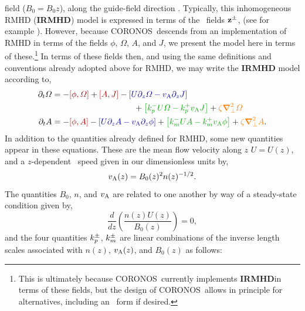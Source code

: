 \documentclass[12pt]{memoir}
\newcommand{\irmhd}{\textbf{IRMHD}}
\newcommand{\coronos}{\textsf{CORONOS}}
\begin{document}
field ($B_0= B_0{z}$), along the guide-field direction 
\citep{HeinemannOlbert80, Vellietal89}.
Typically, this inhomogeneous RMHD (\irmhd) model is expressed in
terms of the \elsasser\ fields $\mathbf{z}^\pm$, 
(see for example \citet{PerezChandran2013}). However, because \coronos\
descends from an implementation of RMHD in terms of the fields
$\phi$, $\Omega$, $A$, and $J$, we present the model here in terms
of these.\footnote{This is ultimately because \coronos\ currently 
implements \irmhd in terms of these fields, but the design of \coronos\ allows 
in principle for alternatives, including an \elsasser\ form if desired.}
In terms of these fields then, and using the same definitions
and conventions already adopted above for RMHD, we may write the \irmhd
model according to,
%
\begin{subequations}
%
  \begin{align}
    \pardt\Omega &=
    - {\color{red!65!black}[\phi,\Omega]} + {\color{red!65!black}[A,J]}
    - {\color{blue!65!black}\left[U\pardz\Omega - \magvalfven\pardz J\right]} \nonumber \\ 
    & \qquad\qquad\qquad\qquad\qquad + {\color{green!65!black}\left[\kpm U\Omega - \kpp\magvalfven J\right]} 
    + {\color{orange}\zeta\delperp^2\Omega}
    \label{eq:ihomega}  \\
%
    \pardt A     &=
    - {\color{red!65!black}[\phi,A]}
    - {\color{blue!65!black}\left[U\pardz A  - \magvalfven\pardz\phi\right]}
    + {\color{green!65!black}\left[\kmm U A  - \kmp\magvalfven\phi\right]}
    + {\color{orange}\zeta\delperp^2A}.
    \label{eq:iha}
  \end{align}
\end{subequations}
%
In addition to the quantities already defined for RMHD, some new quantities
appear in these equations. These are the mean flow velocity along $z$ $U=U(z)$,
and a $z$-dependent \Alfven\ speed given in our dimensionless units by,
%
\begin{equation}
  v_{\mathrm{A}}(z)=B_0(z)^2n(z)^{-1/2}.
\end{equation}
%
The quantities $B_0$, $n$, and $v_{\mathrm{A}}$ are related to one
another by way of a steady-state condition given by, \citep{Whang80}
%
\begin{equation}
  \frac{d}{dz}\left(\frac{n(z)U(z)}{B_0(z)}\right) = 0 \label{eq:consflux},
\end{equation}
%
and the four quantities $k_p^\pm$, $k_m^\pm$ are linear combinations of 
the inverse length scales associated with $n(z)$, $v_{\mathrm{A}}(z)$, and
$B_0(z)$ as follows:
\end{document}
